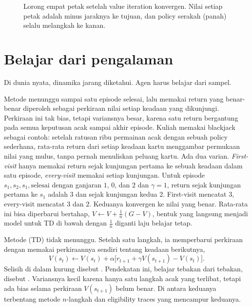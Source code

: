 \begin{figure}[ht]
\centering
{}
\caption{Lorong empat petak setelah value iteration konvergen. Nilai setiap petak adalah minus jaraknya ke tujuan, dan
policy serakah (panah) selalu melangkah ke kanan.}
\label{fig:lorong}
\end{figure}

\section{Belajar dari pengalaman}

Di dunia nyata, dinamika jarang diketahui. Agen harus belajar dari sampel.

Metode  menunggu sampai satu episode selesai, lalu memakai return yang
benar-benar diperoleh sebagai perkiraan nilai setiap keadaan yang dikunjungi. Perkiraan ini tak
bias, tetapi variansnya besar, karena satu return bergantung pada semua keputusan acak sampai akhir
episode. Kuliah memakai blackjack sebagai contoh: setelah ratusan ribu permainan acak dengan sebuah policy sederhana, rata-rata
return dari setiap keadaan kartu menggambar permukaan nilai yang mulus, tanpa pernah menuliskan peluang kartu. Ada dua
varian. \emph{First-visit} hanya memakai return sejak kunjungan pertama ke sebuah keadaan dalam satu episode, \emph{every-visit}
memakai setiap kunjungan. Untuk episode $s_1,s_2,s_1,\text{selesai}$ dengan ganjaran $1$, $0$, dan $2$ dan $\gamma=1$, return sejak
kunjungan pertama ke $s_1$ adalah $3$ dan sejak kunjungan kedua $2$. First-visit mencatat $3$, every-visit mencatat $3$ dan $2$.
Keduanya konvergen ke nilai yang benar. Rata-rata ini bisa diperbarui bertahap, $V\leftarrow V+\tfrac1n(G-V)$, bentuk yang
langsung menjadi model untuk TD di bawah dengan $\tfrac1n$ diganti laju belajar tetap.

Metode  (TD) tidak menunggu. Setelah satu langkah, ia memperbarui
perkiraan dengan memakai perkiraannya sendiri tentang keadaan berikutnya,
\begin{equation}
V(s_t)\leftarrow V(s_t)+\alpha\big[r_{t+1}+\gamma V(s_{t+1})-V(s_t)\big].
\end{equation}
Selisih di dalam kurung disebut . Pendekatan ini, belajar tebakan dari tebakan,
disebut . Variansnya kecil karena hanya satu langkah acak yang terlibat, tetapi
ada bias selama perkiraan $V(s_{t+1})$ belum benar. Di antara keduanya terbentang metode $n$-langkah
dan eligibility traces yang mencampur keduanya.

